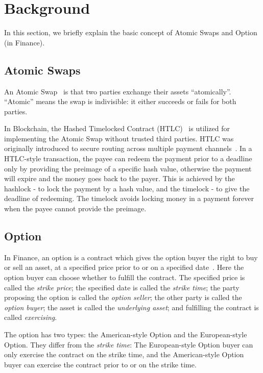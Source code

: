 \section{Background}
\label{sec:background}

In this section, we briefly explain the basic concept of Atomic Swaps and Option (in Finance).

\subsection{Atomic Swaps}

An Atomic Swap~\cite{nolan2013alt} is that two parties exchange their assets ``atomically''.
``Atomic'' means the swap is indivisible: it either succeeds or fails for both parties.

In Blockchain, the Hashed Timelocked Contract (HTLC)~\cite{poon2016bitcoin} is utilized for implementing the Atomic Swap without trusted third parties.
HTLC was originally introduced to secure routing across multiple payment channels~\cite{paychannel2018btcwiki}.
In a HTLC-style transaction, the payee can redeem the payment prior to a deadline only by providing the preimage of a specific hash value, otherwise the payment will expire and the money goes back to the payer.
This is achieved by the hashlock - to lock the payment by a hash value, and the timelock - to give the deadline of redeeming.
The timelock avoids locking money in a payment forever when the payee cannot provide the preimage.

\subsection{Option}
\label{subsec:background_option}

In Finance, an option is a contract which gives the option buyer the right to buy or sell an asset, at a specified price prior to or on a specified date~\cite{higham2004introduction}.
Here the option buyer can choose whether to fulfill the contract.
The specified price is called the \textit{strike price};
the specified date is called the \textit{strike time};
the party proposing the option is called the \textit{option seller};
the other party is called the \textit{option buyer};
the asset is called the \textit{underlying asset};
and fulfilling the contract is called \textit{exercising}.

The option has two types: the American-style Option and the European-style Option.
They differ from the \textit{strike time}:
The European-style Option buyer can only exercise the contract on the strike time,
and the American-style Option buyer can exercise the contract prior to or on the strike time.

